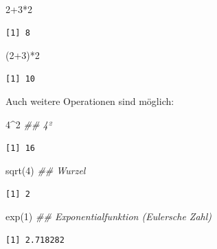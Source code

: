 \documentclass[
  letterpaper,
  DIV=11,
  numbers=noendperiod]{scrreprt}
\newenvironment{Shaded}{\begin{snugshade}}{\end{snugshade}}
\newcommand{\DecValTok}[1]{\textcolor[rgb]{0.68,0.00,0.00}{#1}}
\newcommand{\DocumentationTok}[1]{\textcolor[rgb]{0.37,0.37,0.37}{\textit{#1}}}
\newcommand{\FunctionTok}[1]{\textcolor[rgb]{0.28,0.35,0.67}{#1}}
\newcommand{\NormalTok}[1]{\textcolor[rgb]{0.00,0.46,0.62}{#1}}
\newcommand{\SpecialCharTok}[1]{\textcolor[rgb]{0.37,0.37,0.37}{#1}}
\begin{document}
\begin{Shaded}
\begin{Highlighting}[]
\DecValTok{2}\SpecialCharTok{+}\DecValTok{3}\SpecialCharTok{*}\DecValTok{2}
\end{Highlighting}
\end{Shaded}

\begin{verbatim}
[1] 8
\end{verbatim}

\begin{Shaded}
\begin{Highlighting}[]
\NormalTok{(}\DecValTok{2}\SpecialCharTok{+}\DecValTok{3}\NormalTok{)}\SpecialCharTok{*}\DecValTok{2}
\end{Highlighting}
\end{Shaded}

\begin{verbatim}
[1] 10
\end{verbatim}

Auch weitere Operationen sind möglich:

\begin{Shaded}
\begin{Highlighting}[]
\DecValTok{4}\SpecialCharTok{\^{}}\DecValTok{2} \DocumentationTok{\#\# 4²}
\end{Highlighting}
\end{Shaded}

\begin{verbatim}
[1] 16
\end{verbatim}

\begin{Shaded}
\begin{Highlighting}[]
\FunctionTok{sqrt}\NormalTok{(}\DecValTok{4}\NormalTok{) }\DocumentationTok{\#\# Wurzel }
\end{Highlighting}
\end{Shaded}

\begin{verbatim}
[1] 2
\end{verbatim}

\begin{Shaded}
\begin{Highlighting}[]
\FunctionTok{exp}\NormalTok{(}\DecValTok{1}\NormalTok{) }\DocumentationTok{\#\# Exponentialfunktion (Eulersche Zahl)}
\end{Highlighting}
\end{Shaded}

\begin{verbatim}
[1] 2.718282
\end{verbatim}
\end{document}
